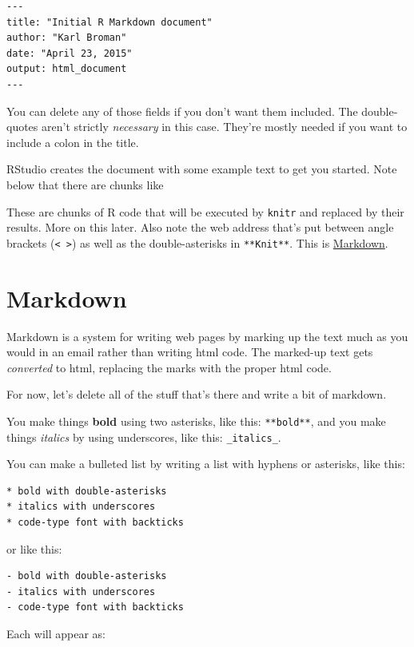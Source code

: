 \documentclass[]{book}
\begin{document}
\begin{verbatim}
---
title: "Initial R Markdown document"
author: "Karl Broman"
date: "April 23, 2015"
output: html_document
---
\end{verbatim}

You can delete any of those fields if you don't want them included. The
double-quotes aren't strictly \emph{necessary} in this case. They're
mostly needed if you want to include a colon in the title.

RStudio creates the document with some example text to get you started.
Note below that there are chunks like

These are chunks of R code that will be executed by \texttt{knitr} and
replaced by their results. More on this later. Also note the web address
that's put between angle brackets (\texttt{\textless{}\ \textgreater{}})
as well as the double-asterisks in \texttt{**Knit**}. This is
\href{http://daringfireball.net/projects/markdown/syntax}{Markdown}.

\section{Markdown}\label{markdown}

Markdown is a system for writing web pages by marking up the text much
as you would in an email rather than writing html code. The marked-up
text gets \emph{converted} to html, replacing the marks with the proper
html code.

For now, let's delete all of the stuff that's there and write a bit of
markdown.

You make things \textbf{bold} using two asterisks, like this:
\texttt{**bold**}, and you make things \emph{italics} by using
underscores, like this: \texttt{\_italics\_}.

You can make a bulleted list by writing a list with hyphens or
asterisks, like this:

\begin{verbatim}
* bold with double-asterisks
* italics with underscores
* code-type font with backticks
\end{verbatim}

or like this:

\begin{verbatim}
- bold with double-asterisks
- italics with underscores
- code-type font with backticks
\end{verbatim}

Each will appear as:
\end{document}
